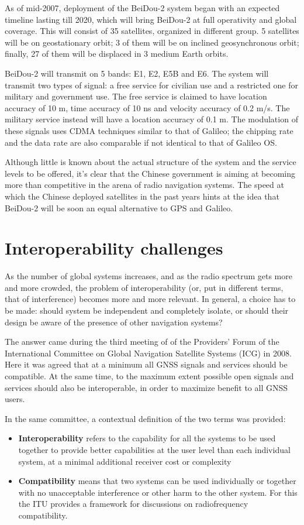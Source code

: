 As of mid-2007, deployment of the BeiDou-2 system began with an expected
timeline lasting till 2020, which will bring BeiDou-2 at full operativity and
global coverage. This will consist of 35 satellites, organized in different
group. 5 satellites will be on geostationary orbit; 3 of them will be on
inclined geosynchronous orbit; finally, 27 of them will be displaced in 3 medium
Earth orbits.

BeiDou-2 will transmit on 5 bands: E1, E2, E5B and E6. The system will transmit
two types of signal: a free service for civilian use and a restricted one for
military and government use. The free service is claimed to have location
accuracy of 10 m, time accuracy of 10 ns and velocity accuracy of 0.2 m/s. The
military service instead will have a location accuracy of 0.1 m. The modulation
of these signals uses CDMA techniques similar to that of Galileo; the chipping
rate and the data rate are also comparable if not identical to that of Galileo
OS.

Although little is known about the actual structure of the system and the
service levels to be offered, it's clear that the Chinese government is aiming
at becoming more than competitive in the arena of radio navigation systems. The
speed at which the Chinese deployed satellites in the past years hints at the
idea that BeiDou-2 will be soon an equal alternative to GPS and Galileo.

\section{Interoperability challenges}
As the number of global systems increases, and as the radio spectrum gets more
and more crowded, the problem of interoperability (or, put in different terms,
that of interference) becomes more and more relevant. In general, a choice has
to be made: should system be independent and completely isolate, or should their
design be aware of the presence of other navigation systems?

The answer came during the third meeting of of the Providers' Forum of the
International Committee on Global Navigation Satellite Systems (ICG) in 2008.
Here it was agreed that at a minimum all GNSS signals and services should be
compatible. At the same time, to the maximum extent possible open signals and
services should also be interoperable, in order to maximize benefit to all GNSS
users.

In the same committee, a contextual definition of the two terms was provided:
\begin{itemize}
  \item \textbf{Interoperability} refers to the capability for all the systems
    to be used together to provide better capabilities at the user level than
    each individual system, at a minimal additional receiver cost or complexity
  \item \textbf{Compatibility} means that two systems can be used individually
    or together with no unacceptable interference or other harm to the other
    system. For this the ITU provides a framework for discussions on
    radiofrequency compatibility.
\end{itemize}

